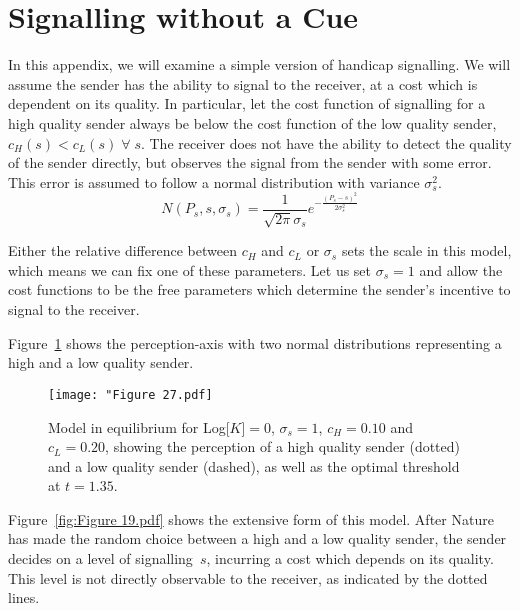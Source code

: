 \documentclass[a4paper,12pt]{article}
\numberwithin{equation}{section}
\begin{document}
\newpage


\section{Signalling without a Cue}
\label{sec:Signalling without a Cue}

In this appendix, we will examine a simple version of handicap signalling. We will assume the sender has the ability to signal to the receiver, at a cost which is dependent on its quality. In particular, let the cost function of signalling for a high quality sender always be below the cost function of the low quality sender, $c_{H}(s)<c_{L}(s) \; \forall \; s$. The receiver does not have the ability to detect the quality of the sender directly, but observes the signal from the sender with some error. This error is assumed to follow a normal distribution with variance $\sigma^{2}_{s}$.
\begin{equation}
\label{eq:SignalDetectionModel/Normal}
N(P_{s}, s, \sigma_{s}) = \frac{1}{\sqrt{2 \pi} \sigma_{s}} e^{-\frac{(P_{s}-s)^2}{2 \sigma_{s}^2}}
\end{equation}

Either the relative difference between $c_{H}$ and $c_{L}$ or $\sigma_{s}$ sets the scale in this model, which means we can fix one of these parameters. Let us set $\sigma_{s}=1$ and allow the cost functions to be the free parameters which determine the sender's incentive to signal to the receiver.

Figure~\ref{fig:Figure 27.pdf} shows the perception-axis with two normal distributions representing a high and a low quality sender.

\begin{figure}[!h]
\captionsetup{width=300pt}
\begin{center}
\leavevmode
\texttt{[image: "Figure 27.pdf]}
\caption{Model in equilibrium for Log[$K$]$=0$, $\sigma_{s}=1$, $c_{H}=0.10$ and $c_{L}=0.20$, showing the perception of a high quality sender (dotted) and a low quality sender (dashed), as well as the optimal threshold at $t=1.35$.}
\label{fig:Figure 27.pdf}
\end{center}
\end{figure}

Figure~\ref{fig:Figure 19.pdf} shows the extensive form of this model. After Nature has made the random choice between a high and a low quality sender, the sender decides on a level of signalling~$s$, incurring a cost which depends on its quality. This level is not directly observable to the receiver, as indicated by the dotted lines.
\end{document}
